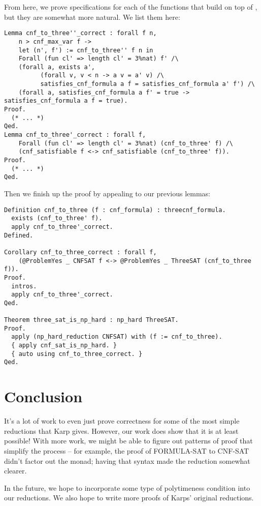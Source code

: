 \documentclass{article}
\begin{document}
From here, we prove specifications for each of the functions that build on top
of , but they are somewhat more natural. We list them here:

\begin{verbatim}
Lemma cnf_to_three''_correct : forall f n,
    n > cnf_max_var f ->
    let (n', f') := cnf_to_three'' f n in
    Forall (fun cl' => length cl' = 3%nat) f' /\
    (forall a, exists a',
          (forall v, v < n -> a v = a' v) /\
          satisfies_cnf_formula a f = satisfies_cnf_formula a' f') /\
    (forall a, satisfies_cnf_formula a f' = true -> satisfies_cnf_formula a f = true).
Proof.
  (* ... *)
Qed.
Lemma cnf_to_three'_correct : forall f,
    Forall (fun cl' => length cl' = 3%nat) (cnf_to_three' f) /\
    (cnf_satisfiable f <-> cnf_satisfiable (cnf_to_three' f)).
Proof.
  (* ... *)
Qed.
\end{verbatim}

Then we finish up the proof by appealing to our previous lemmas:

\begin{verbatim}
Definition cnf_to_three (f : cnf_formula) : threecnf_formula.
  exists (cnf_to_three' f).
  apply cnf_to_three'_correct.
Defined.

Corollary cnf_to_three_correct : forall f,
    (@ProblemYes _ CNFSAT f <-> @ProblemYes _ ThreeSAT (cnf_to_three f)).
Proof.
  intros.
  apply cnf_to_three'_correct.
Qed.

Theorem three_sat_is_np_hard : np_hard ThreeSAT.
Proof.
  apply (np_hard_reduction CNFSAT) with (f := cnf_to_three).
  { apply cnf_sat_is_np_hard. }
  { auto using cnf_to_three_correct. }
Qed.
\end{verbatim}

\section{Conclusion}

It's a lot of work to even just prove correctness for some of the most simple
reductions that Karp gives. However, our work does show that it is at least
possible! With more work, we might be able to figure out patterns of proof that
simplify the process -- for example, the proof of FORMULA-SAT to CNF-SAT didn't
factor out the \coq{Fresh} monad; having that syntax made the reduction somewhat
clearer.

In the future, we hope to incorporate some type of polytimeness condition into
our reductions. We also hope to write more proofs of Karps' original reductions.
\end{document}
